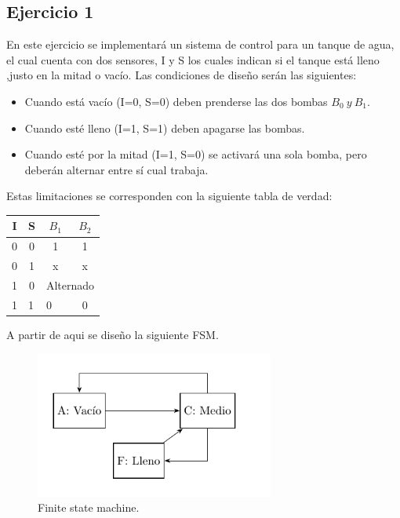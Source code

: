 



\subsection{Ejercicio 1}

En este ejercicio se implementará un sistema de control para un tanque de agua, el cual cuenta con dos sensores, I y S los cuales indican si el tanque está lleno ,justo en la mitad o vacío. Las condiciones de diseño serán las siguientes:
\begin{itemize}
\item Cuando está vacío (I=0, S=0) deben prenderse las dos bombas $B_0 \ y \ B_1$.
\item Cuando esté lleno (I=1, S=1) deben apagarse las bombas.
\item Cuando esté por la mitad (I=1, S=0) se activará una sola bomba, pero deberán alternar entre sí cual trabaja.
\end{itemize}
Estas limitaciones se corresponden con la siguiente tabla de verdad:
\begin{table}[H]
\centering
\begin{tabular}{|c|c|c|c|}
\hline
\textbf{I}              & \textbf{S}             & \textbf{$B_1$}         & \textbf{$B_2$} \\ \hline
0                       & 0                      & 1                      & 1              \\ \hline
0                       & 1                      & x                      & x              \\ \hline
1                       & 0                      & \multicolumn{2}{c|}{Alternado}          \\ \hline
\multicolumn{1}{|l|}{1} & \multicolumn{1}{l|}{1} & \multicolumn{1}{l|}{0} & 0              \\ \hline
\end{tabular}
\end{table}
A partir de aqui se diseño la siguiente FSM.
\begin{figure}[H]
	\centering
	\includegraphics[width=0.7\textwidth]{ImagenesEjercicio1/Bloques-TT.pdf}
	\caption{Finite state machine.}
	\label{fig:fsm}
\end{figure}
